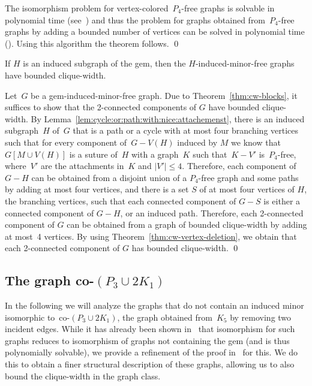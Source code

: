 \documentclass[envcountsame,envcountsect,11pt,a4paper]{llncs}
\renewenvironment{proof}{\begin{Proof}}{\qed\end{Proof}}
\begin{document}
\begin{proof}
The isomorphism problem for vertex-colored~$P_4$-free graphs is solvable in polynomial time (see~\cite{stacsSchweitzer}) and thus the problem for graphs obtained from~$P_4$-free graphs by adding a bounded number of vertices can be solved in polynomial time (\cite[Theorem 1]{DBLP:conf/swat/KratschS10}).
Using this algorithm the theorem follows.
\end{proof}


\begin{theorem}
\label{thm:gem_cw}
If $H$ is an induced subgraph of the gem,
then the $H$-induced-minor-free graphs have bounded clique-width.
\end{theorem}
\begin{proof}
Let~$G$ be a gem-induced-minor-free graph. Due to Theorem~\ref{thm:cw-blocks}, it suffices to show that the 2-connected components of $G$ have bounded clique-width.
By Lemma~\ref{lem:cycle:or:path:with:nice:attachemenst}, there is an induced subgraph~$H$ of~$G$ that is a path or a cycle with at most four branching vertices such that for every component
of~$G-V(H)$ induced by $M$ we know that~$G[M \cup V(H)]$ is a suture of~$H$ with a graph~$K$ such that~$K - V'$ is~$P_4$-free, where~$V'$ are the attachments in~$K$ and $|V'|\leq 4$. 
Therefore, each component of $G-H$ can be obtained from a disjoint union of a $P_4$-free graph and some paths
by adding at most four vertices, and there is a set $S$ of at
most four vertices of $H$, the branching vertices, such that each connected component of $G-S$ is either a connected component of $G-H$, or an
induced path. Therefore, each 2-connected component of $G$ can be obtained from a graph of bounded clique-width by adding at most~4
vertices. By using Theorem~\ref{thm:cw-vertex-deletion}, we obtain that each 2-connected component of $G$ has bounded clique-width.
\end{proof}

\subsection{The graph co-$(P_{3} \cup 2 K_{1})$}

In the following we will analyze the graphs that do not contain an induced minor isomorphic to~co-$(P_{3} \cup 2 K_{1})$, the graph obtained from~$K_5$ by removing two incident edges. While it has already been shown in~\cite{Ponomarenko88} that isomorphism for such graphs reduces to isomorphism of graphs not containing the gem (and is thus polynomially solvable), we provide a refinement of the proof in~\cite{Ponomarenko88} for this. We do this to obtain a finer structural description of these graphs, allowing us to also bound the clique-width in the graph class.
\end{document}

